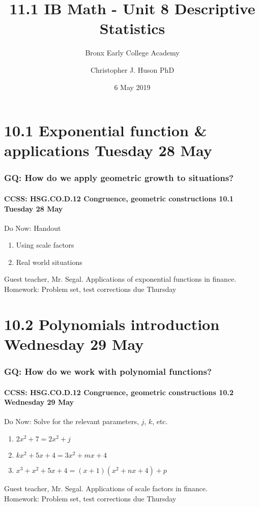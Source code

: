 \documentclass{beamer}
\title{11.1 IB Math - Unit 8 Descriptive Statistics}
\subtitle{Bronx Early College Academy}
\author{Christopher J. Huson PhD}
\date{6 May 2019}
\begin{document}
  \frame{\titlepage}
  \section[Outline]{}
  \frame{\tableofcontents}

\section{10.1 Exponential function \& applications Tuesday 28 May}
  \frame
  {
    \frametitle{GQ: How do we apply geometric growth to situations?}
    \framesubtitle{CCSS: HSG.CO.D.12 Congruence, geometric constructions \hfill \alert{10.1 Tuesday 28 May}}

    \begin{block}{Do Now: Handout}
      \begin{enumerate}
        \item Using scale factors
        \item Real world situations
      \end{enumerate}
    \end{block}
    Guest teacher, Mr. Segal. Applications of exponential functions in finance.\\[0.25cm]
    Homework: Problem set, test corrections due Thursday
  }

\section{10.2 Polynomials introduction Wednesday 29 May}
  \frame
  {
    \frametitle{GQ: How do we work with polynomial functions?}
    \framesubtitle{CCSS: HSG.CO.D.12 Congruence, geometric constructions \hfill \alert{10.2 Wednesday 29 May}}

    \begin{block}{Do Now: Solve for the relevant parameters, $j$, $k$, etc.}
      \begin{enumerate}
        \item $2x^2+7=2x^2+j$
        \item $kx^2+5x+4=3x^2+mx+4$
        \item $x^3+x^2+5x+4=(x+1)(x^2+nx+4)+p$
      \end{enumerate}
    \end{block}
    Guest teacher, Mr. Segal. Applications of scale factors in finance.\\[0.25cm]
    Homework: Problem set, test corrections due Thursday
  }
\end{document}
